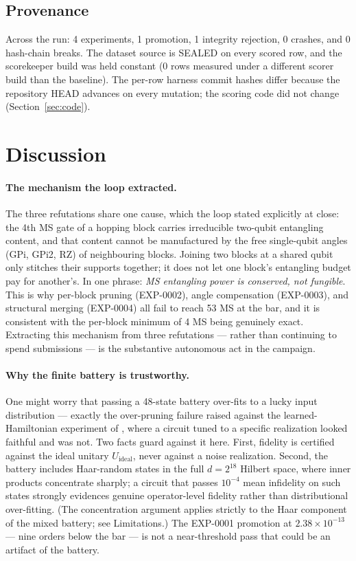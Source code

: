 \documentclass[11pt]{article}
\begin{document}
\subsection{Provenance}

Across the run: 4 experiments, 1 promotion, 1 integrity rejection, 0 crashes, and 0
hash-chain breaks. The dataset source is SEALED on every scored row, and the
scorekeeper build was held constant (0 rows measured under a different scorer build
than the baseline). The per-row harness commit hashes differ because the repository
HEAD advances on every mutation; the scoring code did not change
(Section~\ref{sec:code}).

\section{Discussion}
\label{sec:discussion}

\paragraph{The mechanism the loop extracted.} The three refutations share one cause,
which the loop stated explicitly at close: the 4th MS gate of a hopping block carries
irreducible two-qubit entangling content, and that content cannot be manufactured by
the free single-qubit angles (GPi, GPi2, RZ) of neighbouring blocks. Joining two
blocks at a shared qubit only stitches their supports together; it does not let one
block's entangling budget pay for another's. In one phrase: \emph{MS entangling power
is conserved, not fungible}. This is why per-block pruning (EXP-0002), angle
compensation (EXP-0003), and structural merging (EXP-0004) all fail to reach 53 MS at
the bar, and it is consistent with the per-block minimum of 4 MS being genuinely
exact. Extracting this mechanism from three refutations --- rather than continuing to
spend submissions --- is the substantive autonomous act in the campaign.

\paragraph{Why the finite battery is trustworthy.} One might worry that passing a
48-state battery over-fits to a lucky input distribution --- exactly the over-pruning
failure raised against the learned-Hamiltonian experiment of \cite{Jafferis2022},
where a circuit tuned to a specific realization looked faithful and was not. Two
facts guard against it here. First, fidelity is certified against the ideal unitary
$U_{\mathrm{ideal}}$, never against a noise realization. Second, the battery includes
Haar-random states in the full $d = 2^{18}$ Hilbert space, where inner products
concentrate sharply; a circuit that passes $10^{-4}$ mean infidelity on such states
strongly evidences genuine operator-level fidelity rather than distributional
over-fitting. (The concentration argument applies strictly to the Haar component of
the mixed battery; see Limitations.) The EXP-0001 promotion at $2.38\times10^{-13}$
--- nine orders below the bar --- is not a near-threshold pass that could be an artifact
of the battery.
\end{document}

